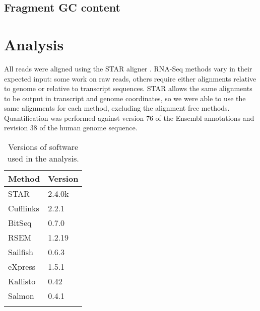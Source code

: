 \documentclass{article}
\begin{document}
\subsection{Fragment GC content}\label{fragment-gc-content}

\section{Analysis}

All reads were aligned using the STAR aligner \cite{Dobin:2013fg}. RNA-Seq
methods vary in their expected input: some work on raw reads, others require
either alignments relative to genome or relative to transcript sequences. STAR
allows the same alignments to be output in transcript and genome coordinates, so
we were able to use the same alignments for each method, excluding the alignment
free methods. Quantification was performed against version 76 of the Ensembl
annotations and revision 38 of the human genome sequence.

\begin{table}
\begin{center}
\begin{tabular}[c]{ll}
\toprule\addlinespace
Method & Version \\
\midrule
STAR & 2.4.0k \\\addlinespace
Cufflinks & 2.2.1 \\\addlinespace
BitSeq & 0.7.0 \\\addlinespace
RSEM & 1.2.19 \\\addlinespace
Sailfish & 0.6.3 \\\addlinespace
eXpress & 1.5.1 \\\addlinespace
Kallisto & 0.42 \\\addlinespace
Salmon & 0.4.1 \\\addlinespace
\bottomrule
\addlinespace
\end{tabular}
\caption{Versions of software used in the analysis.}
\end{center}
\end{table}
\end{document}
